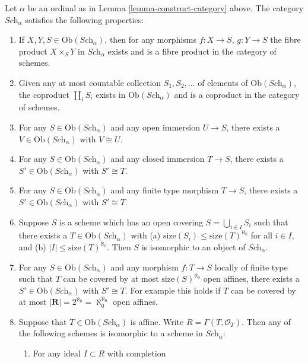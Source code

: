 \begin{lemma}
\label{lemma-what-is-in-it}
Let $\alpha$ be an ordinal as in Lemma \ref{lemma-construct-category} above.
The category $\textit{Sch}_\alpha$ satisfies the following
properties:
\begin{enumerate}
\item If $X, Y, S \in \text{Ob}(\textit{Sch}_\alpha)$, then
for any morphisms $f : X \to S$, $g : Y \to S$ the fibre
product $X \times_S Y$ in $\textit{Sch}_\alpha$ exists
and is a fibre product in the category of schemes.
\item Given any at most countable collection $S_1, S_2, \ldots$
of elements of $\text{Ob}(\textit{Sch}_\alpha)$, the coproduct
$\coprod_i S_i$ exists in $\text{Ob}(\textit{Sch}_\alpha)$ and
is a coproduct in the category of schemes.
\item For any $S \in \text{Ob}(\textit{Sch}_\alpha)$ and
any open immersion $U \to S$, there exists a
$V \in \text{Ob}(\textit{Sch}_\alpha)$ with $V \cong U$.
\item For any $S \in \text{Ob}(\textit{Sch}_\alpha)$ and
any closed immersion $T \to S$, there exists a
$S' \in \text{Ob}(\textit{Sch}_\alpha)$ with $S' \cong T$.
\item For any $S \in \text{Ob}(\textit{Sch}_\alpha)$ and
any finite type morphism $T \to S$, there exists a
$S' \in \text{Ob}(\textit{Sch}_\alpha)$ with $S' \cong T$.
\item Suppose $S$ is a scheme which has an open covering
$S = \bigcup_{i \in I} S_i$ such that there exists
a $T \in \text{Ob}(\textit{Sch}_\alpha)$ with
(a) $\text{size}(S_i) \leq \text{size}(T)^{\aleph_0}$ for all
$i \in I$, and (b) $|I| \leq \text{size}(T)^{\aleph_0}$.
Then $S$ is isomorphic to an object of $\textit{Sch}_\alpha$.
\item For any $S \in \text{Ob}(\textit{Sch}_\alpha)$ and
any morphism $f : T \to S$ locally of finite type such
that $T$ can be covered by at most
$\text{size}(S)^{\aleph_0}$ open affines, there exists a
$S' \in \text{Ob}(\textit{Sch}_\alpha)$ with $S' \cong T$.
For example this holds if $T$ can be covered by at most
$|\mathbf{R}| = 2^{\aleph_0} = \aleph_0^{\aleph_0}$ open affines.
\item Suppose that $T \in \text{Ob}(\textit{Sch}_\alpha)$ is
affine. Write $R = \Gamma(T, \mathcal{O}_T)$.
Then any of the following schemes is isomorphic to a scheme
in $\textit{Sch}_\alpha$:
\begin{enumerate}
\item For any ideal $I \subset R$ with completion

\end{enumerate}
\end{enumerate}
\end{lemma}
